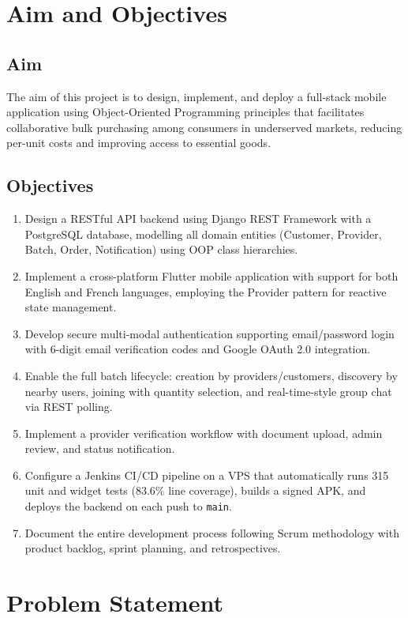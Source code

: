 \documentclass[12pt, a4paper]{report}
\begin{document}
\section{Aim and Objectives}

\subsection*{Aim}
The aim of this project is to design, implement, and deploy a full-stack mobile application using Object-Oriented Programming principles that facilitates collaborative bulk purchasing among consumers in underserved markets, reducing per-unit costs and improving access to essential goods.

\subsection*{Objectives}
\begin{enumerate}[leftmargin=*, label=\textcolor{batchitGreen}{\textbf{\arabic*.}}]
  \item Design a RESTful API backend using Django REST Framework with a PostgreSQL database, modelling all domain entities (Customer, Provider, Batch, Order, Notification) using OOP class hierarchies.
  \item Implement a cross-platform Flutter mobile application with support for both English and French languages, employing the Provider pattern for reactive state management.
  \item Develop secure multi-modal authentication supporting email/password login with 6-digit email verification codes and Google OAuth 2.0 integration.
  \item Enable the full batch lifecycle: creation by providers/customers, discovery by nearby users, joining with quantity selection, and real-time-style group chat via REST polling.
  \item Implement a provider verification workflow with document upload, admin review, and status notification.
  \item Configure a Jenkins CI/CD pipeline on a VPS that automatically runs 315 unit and widget tests (83.6\% line coverage), builds a signed APK, and deploys the backend on each push to \texttt{main}.
  \item Document the entire development process following Scrum methodology with product backlog, sprint planning, and retrospectives.
\end{enumerate}

\section{Problem Statement}
\end{document}

